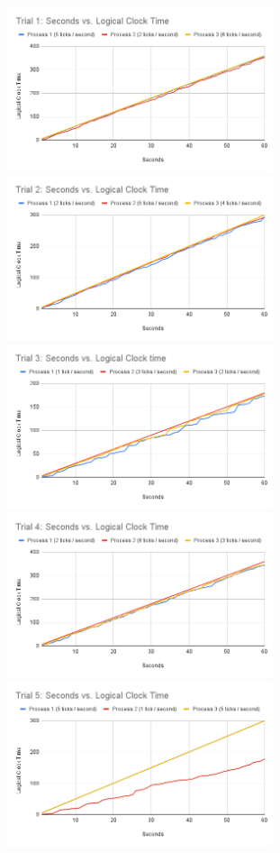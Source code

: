\documentclass[
	a4paper, %
	10pt, %
	unnumberedsections, %
	twoside, %
]{LTJournalArticle}
\begin{document}
\newpage
$$ $$
\newpage
\includegraphics[width=7.8cm]{assets/t1_clock.png}
\includegraphics[width=7.8cm]{assets/t2_clock.png}
\includegraphics[width=7.8cm]{assets/t3_clock.png}
\includegraphics[width=7.8cm]{assets/t4_clock.png}
\includegraphics[width=7.8cm]{assets/t5_clock.png}
\end{document}

